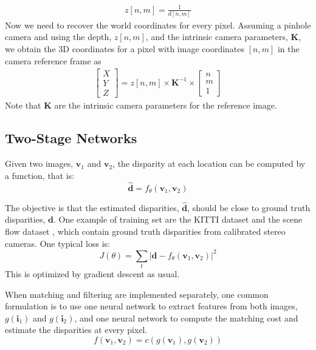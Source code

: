 \begin{align}
z \left[n,m \right] = \frac{1}{ d \left[n,m \right] }
\end{align}
Now we need to recover the world coordinates for every pixel. 
Assuming a pinhole camera and using the depth, $z \left[n,m \right]$, and the intrinsic camera parameters, $\mathbf{K}$, we obtain the 3D coordinates for a pixel with image coordinates $[n,m]$ in the camera reference frame as
\begin{align}
\begin{bmatrix}
X \\
Y \\ 
Z 
\end{bmatrix}
= z\left[n,m \right] \times \mathbf{K}^{-1} \times
\begin{bmatrix}
n \\
m \\ 
1 
\end{bmatrix}
\end{align}
Note that $\mathbf{K}$ are the intrinsic camera parameters for the reference image. 

\subsection{Two-Stage Networks}
Given two images, $\mathbf{v}_1$ and $\mathbf{v}_2$, the disparity at each location can be computed by a function, that is:
\begin{equation}
    \hat{\mathbf{d}} = f_{\theta}(\mathbf{v}_1, \mathbf{v}_2)
\end{equation}

The objective is that the estimated disparities, $\hat{\mathbf{d}}$, should be close to ground truth disparities, $\mathbf{d}$. One example of training set are the KITTI dataset \cite{Geiger2013} and the scene flow dataset \cite{Mayer2016}, which contain ground truth disparities  from calibrated stereo cameras. One typical loss is:
\begin{equation}
    J(\theta) = \sum_t \left| \mathbf{d} - f_{\theta} (\mathbf{v}_1, \mathbf{v}_2) \right|^2
\end{equation}
This is optimized by gradient descent as usual.


When matching and filtering are implemented separately, one common formulation is to use one neural network to extract features from both images, $g(\mathbf{i}_1)$ and $g(\mathbf{i}_2)$, and one neural network to compute the matching cost and estimate the disparities at every pixel. 
\begin{equation}
    f(\mathbf{v}_1, \mathbf{v}_2) = c \left( g(\mathbf{v}_1), g(\mathbf{v}_2) \right)
\end{equation}


